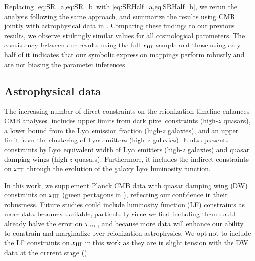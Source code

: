 Replacing \cref{eq:SR_a,eq:SR_b} with \cref{eq:SRHalf_a,eq:SRHalf_b}, we
rerun the analysis following the same approach, and summarize the
results using CMB jointly with astrophysical data in
.
Comparing these findings to our previous results, we observe strikingly
similar values for all cosmological parameters.
The consistency between our results using the full $x_{\mathrm{HI}}$ sample and
those using only half of it indicates that our symbolic expression
mappings perform robustly and are not biasing the parameter inferences.


\subsection*{Astrophysical data}
\label{ssec:xHI}

The increasing number of direct constraints on the reionization timeline
enhances CMB analyses.
 includes upper limits from dark pixel
constraints\cite{Jin2023} (high-$z$ quasars), a lower bound from the
Ly$\alpha$ emission fraction\cite{Mesinger2015} (high-$z$ galaxies), and
an upper limit from the clustering of Ly$\alpha$
emitters\cite{Sobacchi2015} (high-$z$ galaxies).
It also presents constraints by Ly$\alpha$ equivalent width of
Ly$\alpha$ emitters\cite{Mason2018, Mason2019, Hoag2019} (high-$z$
galaxies) and quasar damping wings\cite{Greig2022, Greig2024, Spina2024,
Durovcikova2024} (high-$z$ quasars).
Furthermore, it includes the indirect constraints on $x_{\mathrm{HI}}$ through the
evolution of the galaxy Ly$\alpha$ luminosity
function\cite{Morales2021}.

In this work, we supplement Planck CMB data with quasar damping wing
(DW) constraints on $x_{\mathrm{HI}}$ (green pentagons in ),
reflecting our confidence in their robustness.
Future studies could include luminosity function (LF) constraints as
more data becomes available, particularly since we find including them
could already halve the error on $\tau_{\mathrm{reio}}$, and because more data
will enhance our ability to constrain and marginalize over reionization
astrophysics.
We opt not to include the LF constraints on $x_{\mathrm{HI}}$ in this work as they
are in slight tension with the DW data at the current stage
().


